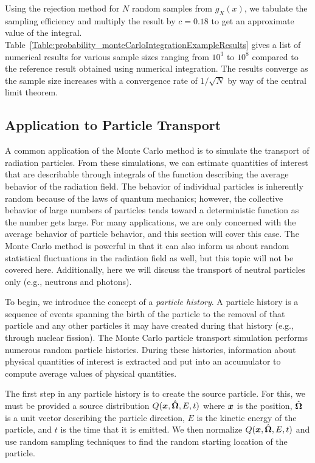 Using the rejection method for $N$ random samples from $g_X(x)$, we tabulate the sampling efficiency and multiply the result by $c = 0.18$ to get an approximate value of the integral. Table~\ref{Table:probability_monteCarloIntegrationExampleResults} gives a list of numerical results for various sample sizes ranging from $10^3$ to $10^8$ compared to the reference result obtained using numerical integration. The results converge as the sample size increases with a convergence rate of $1/\sqrt{N}$ by way of the central limit theorem.


\subsection{Application to Particle Transport}

A common application of the Monte Carlo method is to simulate the transport of radiation particles. From these simulations, we can estimate quantities of interest that are describable through integrals of the function describing the average behavior of the radiation field. The behavior of individual particles is inherently random because of the laws of quantum mechanics; however, the collective behavior of large numbers of particles tends toward a deterministic function as the number gets large. For many applications, we are only concerned with the average behavior of particle behavior, and this section will cover this case. The Monte Carlo method is powerful in that it can also inform us about random statistical fluctuations in the radiation field as well, but this topic will not be covered here. Additionally, here we will discuss the transport of neutral particles only (e.g., neutrons and photons).

To begin, we introduce the concept of a \emph{particle history}. A particle history is a sequence of events spanning the birth of the particle to the removal of that particle and any other particles it may have created during that history (e.g., through nuclear fission). The Monte Carlo particle transport simulation performs numerous random particle histories. During these histories, information about physical quantities of interest is extracted and put into an accumulator to compute average values of physical quantities.

The first step in any particle history is to create the source particle. For this, we must be provided a source distribution $Q(\bm{x},\hat{\mathbf{\Omega}},E,t)$ where $\bm{x}$ is the position, $\hat{\mathbf{\Omega}}$ is a unit vector describing the particle direction, $E$ is the kinetic energy of the particle, and $t$ is the time that it is emitted. We then normalize $Q(\bm{x},\hat{\mathbf{\Omega}},E,t)$ and use random sampling techniques to find the random starting location of the particle.

